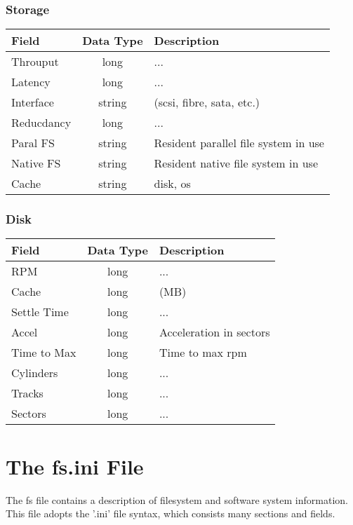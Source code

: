 \documentclass{article}
\begin{document}
\subsubsection{Storage}
\label{sec:Storage}
\begin{flushleft}
  \begin{tabular}{l | c | l}
    Field & Data Type & Description\\\hline
    Throuput & long & ... \\
    Latency & long & ... \\
    Interface & string & (scsi, fibre, sata, etc.)\\
    Reducdancy & long & ...\\
    Paral FS & string & Resident parallel file system in use\\
    Native FS & string & Resident native file system in use \\
    Cache & string & disk, os \\
  \end{tabular}
\end{flushleft}

\subsubsection{Disk}
\label{sec:Disk}
\begin{flushleft}
  \begin{tabular}{l | c | l}
    Field & Data Type & Description\\\hline
    RPM & long & ...\\
    Cache & long & (MB)\\
    Settle Time & long & ...\\
    Accel & long & Acceleration in sectors\\
    Time to Max & long & Time to max rpm \\
    Cylinders & long & ...\\
    Tracks & long & ...\\
    Sectors & long & ...\\
  \end{tabular}
\end{flushleft}

\section{The fs.ini File}
\label{sec:TheFsIniFile}
The fs file contains a description of filesystem and software system information. This file adopts the '.ini' file syntax, which consists many sections and fields.
\end{document}

